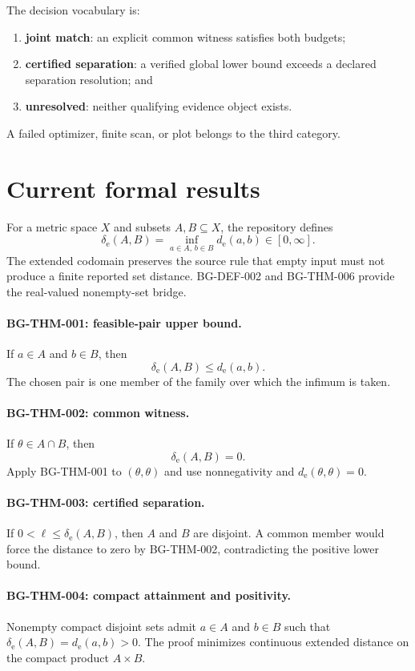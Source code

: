 \documentclass[11pt]{article}
\begin{document}
The decision vocabulary is:
\begin{enumerate}
 \item \textbf{joint match}: an explicit common witness satisfies both budgets;
 \item \textbf{certified separation}: a verified global lower bound exceeds a declared
 separation resolution; and
 \item \textbf{unresolved}: neither qualifying evidence object exists.
\end{enumerate}
A failed optimizer, finite scan, or plot belongs to the third category.

\section{Current formal results}

For a metric space $X$ and subsets $A,B\subseteq X$, the repository defines
\[
 \delta_{\mathrm e}(A,B)=
 \inf_{a\in A,\,b\in B} d_{\mathrm e}(a,b)\in[0,\infty].
\]
The extended codomain preserves the source rule that empty input must not produce a
finite reported set distance. BG-DEF-002 and BG-THM-006 provide the real-valued nonempty-set bridge.

\paragraph{BG-THM-001: feasible-pair upper bound.}
If $a\in A$ and $b\in B$, then
\[
 \delta_{\mathrm e}(A,B)\le d_{\mathrm e}(a,b).
\]
The chosen pair is one member of the family over which the infimum is taken.

\paragraph{BG-THM-002: common witness.}
If $\theta\in A\cap B$, then
\[
 \delta_{\mathrm e}(A,B)=0.
\]
Apply BG-THM-001 to $(\theta,\theta)$ and use nonnegativity and
$d_{\mathrm e}(\theta,\theta)=0$.

\paragraph{BG-THM-003: certified separation.}
If $0<\ell\le\delta_{\mathrm e}(A,B)$, then $A$ and $B$ are disjoint. A common member
would force the distance to zero by BG-THM-002, contradicting the positive lower bound.

\paragraph{BG-THM-004: compact attainment and positivity.}
Nonempty compact disjoint sets admit $a\in A$ and $b\in B$ such that
$\delta_{\mathrm e}(A,B)=d_{\mathrm e}(a,b)>0$. The proof minimizes continuous extended
distance on the compact product $A\times B$.
\end{document}
